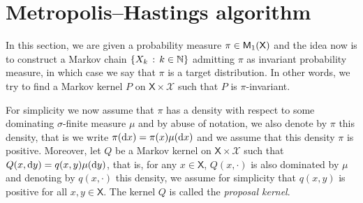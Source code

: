 \documentclass[english,graybox,envcountchap,envcountsame,sectrefs,shortlabels]{svmono}
\theoremstyle{style}
\newcommand{\Xset}{\mathsf{X}}
\newcommand{\Xsigma}{\mathcal{X}}
\begin{document}
\section{Metropolis--Hastings algorithm}
In this section, we are given a probability measure $\pi\in\meas 1(\Xset)$
and the idea now is to construct a Markov chain $\left\{ X_{k}\,:\,k\in\mathbb{N}\right\}$
admitting $\pi$ as invariant probability measure, in which case we
say that $\pi$ is a target distribution. In other words, we try to
find a Markov kernel $P$ on $\Xset\times\Xsigma$ such that $P$
is $\pi$-invariant. %


For simplicity we now assume that $\pi$ has a density with respect
to some dominating $\sigma$-finite measure $\mu$ and by abuse
of notation, we also denote by $\pi$ this density, that is we write
$\pi(\mathrm{d} x)=\pi(x)\mu(\mathrm{d} x)$ and we assume that this density
$\pi$ is positive. Moreover, let $Q$ be a Markov kernel on $\Xset\times\Xsigma$ such
that $Q(x,\mathrm{d} y)=q(x,y)\mu(\mathrm{d} y)$, that is, for any $x\in\Xset$,
$Q(x,\cdot)$ is also dominated by $\mu$ and denoting by $q(x,\cdot)$
this density, we assume for simplicity that $q(x,y)$ is positive
for all $x,y\in\Xset$. The kernel $Q$ is called the \emph{proposal kernel}.
\end{document}

